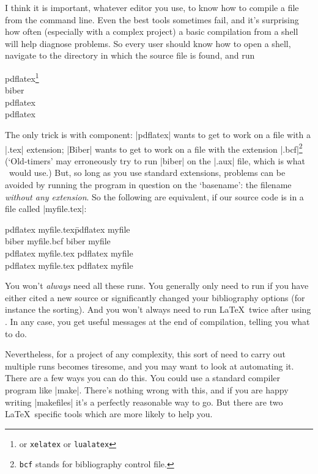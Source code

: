 I think it is important, whatever editor you use, to know how to
compile a file from the command line. Even the best tools sometimes
fail, and it's surprising how often (especially with a complex
project) a basic compilation from a shell will help diagnose
problems. So every user should know how to open a shell, navigate to
the directory in which the source file is found, and run
\begin{pseudoverb}
pdflatex\footnote{or \texttt{xelatex} or \texttt{lualatex}} \\
biber \\
pdflatex \\
pdflatex 
\end{pseudoverb}
The only trick is with  component: |pdflatex| wants to
get to work on a file with a |.tex| extension; |Biber| wants to get to
work on a file with the extension |.bcf|\footnote{\texttt{bcf} stands
  for bibliography control file.} (`Old-timers' may erroneously try to
run |biber| on the |.aux| file, which is what \bibtex\ would use.)
But, so long as you use standard extensions, problems can be
avoided by running the program in question on the `basename': the
filename \emph{without any extension}. So the following are
equivalent, if our source code is in a file called |myfile.tex|:
\begin{pseudoverb}
\begin{tabbing}
pdflatex myfile.tex\qquad   \= pdflatex myfile\\
biber myfile.bcf \> biber myfile\\
pdflatex myfile.tex \> pdflatex myfile\\
pdflatex myfile.tex \> pdflatex myfile
\end{tabbing}
\end{pseudoverb}
You won't \emph{always} need all these runs. You generally only need
to run  if you have either cited a new source or
significantly changed your bibliography options (for instance the
sorting). And you won't always need to run \LaTeX\ twice after using
. In any case, you get useful messages at the end of
compilation, telling you what to do.

Nevertheless, for a project of any complexity, this sort of need to
carry out multiple runs becomes tiresome, and you may want to look at
automating it. There are a few ways you can do this. You could use a
standard compiler program like |make|. There's nothing wrong with
this, and if you are happy writing |makefiles| it's a perfectly
reasonable way to go. But there are two \LaTeX\ specific tools which
are more likely to help you.

